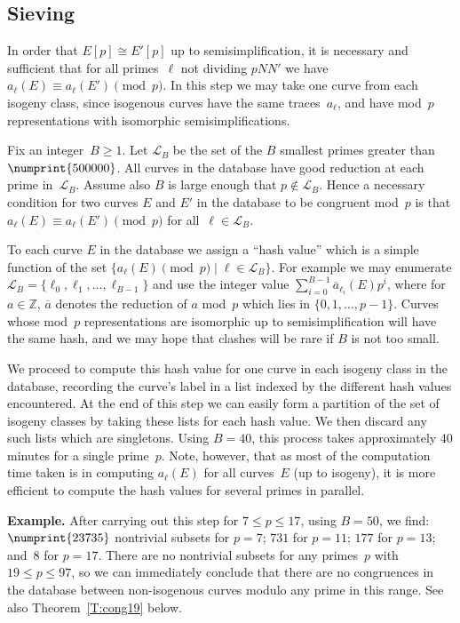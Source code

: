 \documentclass[12pt, reqno]{amsart}
\newcommand{\Z}{\mathbb{Z}}
\newcommand{\calL}{\mathcal{L}}
\numberwithin{equation}{section}
\theoremstyle{definition}
\theoremstyle{remark}
\begin{document}
\subsection{Sieving}
In order that $E[p]\cong E'[p]$ up to semisimplification, it is
necessary and sufficient that for all primes~$\ell$ not dividing
$pNN'$ we have $a_{\ell}(E)\equiv a_{\ell}(E')\pmod{p}$.  In this step
we may take one curve from each isogeny class, since isogenous curves
have the same traces~$a_\ell$, and have mod~$p$ representations with
isomorphic semisimplifications.

Fix an integer~$B\ge1$.  Let $\calL_B$ be the set of the $B$ smallest
primes greater than $\numprint{500000}$. All curves in the database
have good reduction at each prime in~$\calL_B$.  Assume also $B$ is
large enough that $p\notin\calL_B$.  Hence a necessary condition for
two curves $E$ and $E'$ in the database to be congruent mod~$p$ is
that $a_{\ell}(E)\equiv a_{\ell}(E')\pmod{p}$ for all~$\ell\in\calL_B$.

To each curve $E$ in the database we assign a ``hash value'' which is
a simple function of the set $\{a_{\ell}(E)\pmod{p}\mid
\ell\in\calL_B\}$.  For example we may enumerate
$\calL_B=\{\ell_0,\ell_1,\dots,\ell_{B-1}\}$ and use the integer value
$\sum_{i=0}^{B-1}\overline{a}_{\ell_i}(E)p^i$, where for $a\in\Z$,
$\overline{a}$ denotes the reduction of $a$ mod~$p$ which lies in
$\{0,1,\dots,p-1\}$.  Curves whose mod~$p$ representations are
isomorphic up to semisimplification will have the same hash, and we
may hope that clashes will be rare if $B$ is not too small.

We proceed to compute this hash value for one curve in each isogeny
class in the database, recording the curve's label in a list indexed
by the different hash values encountered.  At the end of this step we
can easily form a partition of the set of isogeny classes by taking
these lists for each hash value.  We then discard any such lists which
are singletons.  Using $B=40$, this process takes approximately 40
minutes for a single prime~$p$.  Note, however, that as most of the
computation time taken is in computing $a_{\ell}(E)$ for all
curves~$E$ (up to isogeny), it is more efficient to compute the hash
values for several primes in parallel.

{\bf Example.} After carrying out this step for $7\le p\le17$, using
$B=50$, we find: $\numprint{23735}$ nontrivial subsets for $p=7$;
$731$ for $p=11$; $177$ for $p=13$; and~$8$ for $p=17$.  There are no
nontrivial subsets for any primes~$p$ with $19\le p\le97$, so we can
immediately conclude that there are no congruences in the database
between non-isogenous curves modulo any prime in this range.  See also
Theorem~\ref{T:cong19} below.
\end{document}
